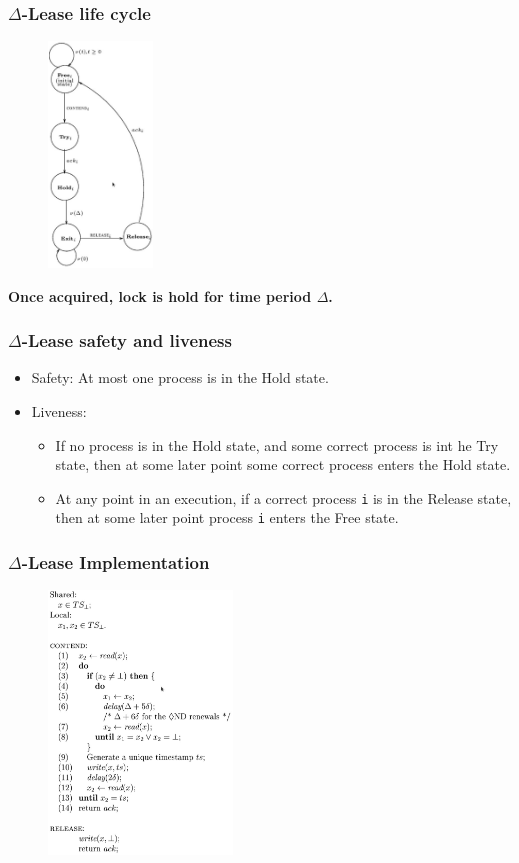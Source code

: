 \documentclass[10pt,utf8]{beamer}
\begin{document}
\begin{frame}
    \frametitle{$\Delta$-Lease life cycle}
    \begin{figure}
        \centering
        \includegraphics[height=6cm]{./img/delta-lease-life-cycle.eps}
    \end{figure}
    
    \centering
    \textbf{Once acquired, lock is hold for time period $\Delta$.}
\end{frame}

\begin{frame}
    \frametitle{$\Delta$-Lease safety and liveness}
    \begin{itemize}
     \item Safety: At most one process is in the Hold state.
     \item Liveness: 
     \begin{itemize}
        \item If no process is in the Hold state, and some correct process is int he Try state, then at some later point some correct process enters the Hold state.
        \item At any point in an execution, if a correct process \texttt{i} is in the Release state, then at some later point process \texttt{i} enters the Free state.
     \end{itemize}
    \end{itemize}
\end{frame}

\begin{frame}
    \frametitle{$\Delta$-Lease Implementation}
    \begin{figure}
        \centering
        \includegraphics[height=7cm]{./img/delta-lease-alg.eps}
    \end{figure}
\end{frame}
\end{document}
